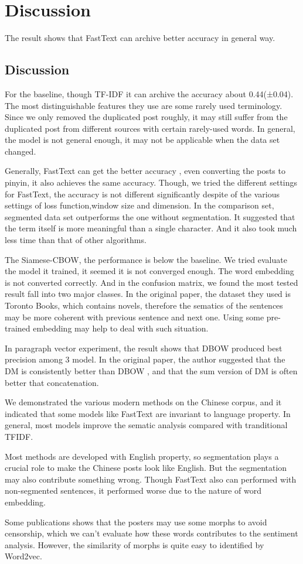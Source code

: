 \chapter{Discussion}

The result shows that FastText can archive better accuracy in general way.

\section{Discussion}


For the baseline, though TF-IDF it can archive the accuracy about 0.44(±0.04). 
The most distinguishable features they use are some rarely used terminology. 
Since we only removed the duplicated post roughly, it may still suffer from the duplicated post from different sources with certain rarely-used words. 
In general, the model is not general enough, it may not be applicable when the data set changed.

Generally, FastText can get the better accuracy , even converting the posts to pinyin,
it also achieves the same accuracy. Though, we tried the different settings for FastText,
the accuracy is not different significantly despite of the various settings of loss function,window size and dimension. In the comparison set, segmented data set outperforms the one without segmentation. 
It suggested that the term itself is more meaningful than a single character. And it also took much less time than that of other algorithms.

The Siamese-CBOW, the performance is below the baseline. 
We tried evaluate the model it trained, it seemed it is not converged enough. 
The word embedding is not converted correctly. And in the confusion matrix, we found the most tested result fall into two major classes.
In the original paper, the dataset they used is Toronto Books, which contains novels,
 therefore the sematics of the sentences may be more coherent with previous sentence and next one. Using some pre-trained embedding may help to deal with such situation. 

In paragraph vector experiment, the result shows that DBOW produced best precision among 3 model. In the original paper, the author suggested that the DM is consistently better than DBOW
, and that the sum version of DM is often better that concatenation.

We demonstrated the various modern methods on the Chinese corpus, and it indicated that some models like FastText are invariant to language property. 
In general, most models improve the sematic analysis compared with tranditional TFIDF.

Most methods are developed with English property, so segmentation plays a crucial role to make the Chinese posts look like English.
 But the segmentation may also contribute something wrong. Though FastText also can performed with non-segmented sentences, it performed worse due to  the nature of word embedding.

Some publications\cite{Chen:2013:TUP:2512938.2512940} shows that the posters may use some morphs to avoid censorship, which we can't evaluate how these words contributes to the sentiment analysis. 
 However, the similarity of morphs is quite easy to identified by Word2vec. 
